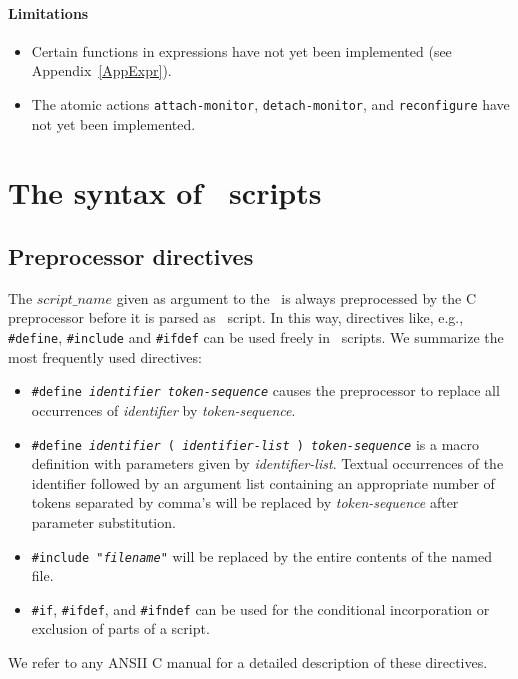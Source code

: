 \paragraph{Limitations}
\begin{itemize}
\item Certain functions in expressions have not yet been implemented
(see Appendix~\ref{AppExpr}).

\item The atomic actions {\tt attach-monitor}, {\tt detach-monitor},
and {\tt reconfigure} have not yet been implemented.
\end{itemize}

\newpage
\section{The syntax of \T\ scripts}
\subsection{Preprocessor directives}

The $script\_name$ given as argument to the \TB\ is always
preprocessed by the C preprocessor before it is parsed as \T\ script.
In this way, directives like, e.g., {\tt \#define}, {\tt \#include} and
{\tt \#ifdef} can be used freely in \T\ scripts. We summarize the
most frequently used directives:
\begin{itemize}
\item {\tt \#define {\em identifier} {\em token-sequence}} causes
the preprocessor to replace all occurrences of {\em identifier}
by {\em token-sequence}.
\item {\tt \#define {\em identifier} ( {\em identifier-list} ) {\em token-sequence}} is
a macro definition with parameters given by {\em identifier-list}.
Textual occurrences of the identifier followed by an argument list
containing an appropriate number of tokens separated by comma's
will be replaced by {\em token-sequence} after parameter substitution.
\item {\tt \#include "{\em filename}"} will be replaced by the
entire contents of the named file.
\item {\tt \#if}, {\tt \#ifdef}, and {\tt \#ifndef} can be used for
the conditional incorporation or exclusion of parts of a script.
\end{itemize}

\noindent We refer to any ANSII C manual for a detailed description of these
directives. 


